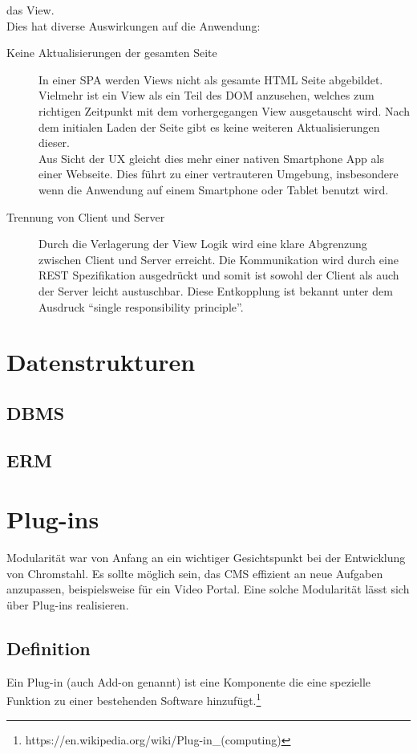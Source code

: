 das View.\\
Dies hat diverse Auswirkungen auf die Anwendung: 
\begin{description}
  \item[Keine Aktualisierungen der gesamten Seite]In einer \ac{SPA} werden Views
    nicht als gesamte \ac{HTML} Seite abgebildet. Vielmehr ist ein View als ein
    Teil des \ac{DOM} anzusehen, welches zum richtigen Zeitpunkt mit dem
    vorhergegangen View ausgetauscht wird. Nach dem initialen Laden der Seite
    gibt es keine weiteren Aktualisierungen dieser.\\
    Aus Sicht der \ac{UX}
    gleicht dies mehr einer nativen Smartphone App als einer Webseite. Dies
    führt zu einer vertrauteren Umgebung, insbesondere wenn die Anwendung auf
    einem Smartphone oder Tablet benutzt wird.
  \item[Trennung von Client und Server]Durch die Verlagerung der
    View Logik wird eine klare Abgrenzung zwischen Client und Server erreicht.
    Die Kommunikation wird durch eine \ac{REST} Spezifikation ausgedrückt und
    somit ist sowohl der Client als auch der Server leicht austuschbar. Diese
    Entkopplung ist bekannt unter dem Ausdruck ``single responsibility principle''\cite{cleancode}.
\end{description}

\section{Datenstrukturen}
\subsection{\acl{DBMS}}
\subsection{\acl{ERM}}
\section{Plug-ins}
Modularität war von Anfang an ein wichtiger Gesichtspunkt bei der Entwicklung
von Chromstahl. Es sollte möglich sein, das \ac{CMS} effizient an neue Aufgaben
anzupassen, beispielsweise für ein Video Portal. Eine solche Modularität lässt
sich über Plug-ins realisieren.
\subsection{Definition}
Ein Plug-in (auch Add-on genannt) ist eine Komponente die eine spezielle
Funktion zu einer bestehenden Software
hinzufügt.\footnote{https://en.wikipedia.org/wiki/Plug-in\_(computing)}
